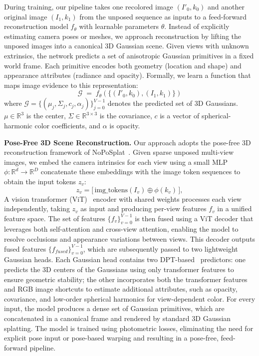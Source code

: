 \documentclass[10pt,twocolumn,letterpaper]{article}
\begin{document}
During training, our pipeline takes one recolored image $(I'_0, k_0)$ and another original image $(I_1, k_1)$ from the unposed sequence as inputs to a feed-forward reconstruction model $f_{\theta}$ with learnable parameters $\theta$.
%
Instead of explicitly estimating camera poses or meshes, we approach reconstruction by lifting the unposed images into a canonical 3D Gaussian scene. Given views with unknown extrinsics, the network predicts a set of anisotropic Gaussian primitives in a fixed world frame. Each primitive encodes both geometry (location and shape) and appearance attributes (radiance and opacity).
%
Formally, we learn a function that maps image evidence to this representation:
\begin{equation*}
\mathcal{G} \;=\; f_{\theta}\!\left(\{(I'_0, k_0),(I_1, k_1)\}\right)
\end{equation*}
where $\mathcal{G}=\{(\mu_j,\Sigma_j,c_j,\alpha_j)\}_{j=0}^{V-1}$ denotes the predicted set of 3D Gaussians. $\mu\!\in\!\mathbb{R}^3$ is the center, $\Sigma\!\in\!\mathbb{R}^{3\times3}$ is the covariance, 
$c$ is a vector of spherical-harmonic color coefficients, and $\alpha$ is opacity.

\vspace{1mm}
\noindent\textbf{Pose-Free 3D Scene Reconstruction.}
Our approach adopts the pose-free 3D reconstruction framework of NoPoSplat~\cite{noposplat}. Given sparse unposed multi-view images, we embed the camera intrinsics for each view using a small MLP $\phi:\mathbb{R}^d \to \mathbb{R}^D$ concatenate these embeddings with the image token sequences to obtain the input tokens $z_v$:
\begin{equation*}
    z_v = \big[\,\text{img\_tokens}(I_v) \oplus \phi(k_v)\,\big],
\end{equation*}
A vision transformer (ViT)~\cite{vit} encoder with shared weights processes each view independently, taking $z_v$ as input and producing per-view features $f_v$ in a unified feature space. The set of features $\{f_v\}_{v=0}^{V-1}$ is then fused using a ViT decoder that leverages both self-attention and cross-view attention, enabling the model to resolve occlusions and appearance variations between views. This decoder outputs fused features $\{f_{fused}\}_{v=0}^{V-1}$, which are subsequently passed to two lightweight Gaussian heads.
%
Each Gaussian head contains two DPT-based~\cite{dust3r} predictors: one predicts the 3D centers of the Gaussians using only transformer features to ensure geometric stability; the other incorporates both the transformer features and RGB image shortcuts to estimate additional attributes, such as opacity, covariance, and low-order spherical harmonics for view-dependent color. For every input, the model produces a dense set of Gaussian primitives, which are concatenated in a canonical frame and rendered by standard 3D Gaussian splatting. The model is trained using photometric losses, eliminating the need for explicit pose input or pose-based warping and resulting in a pose-free, feed-forward pipeline.
\end{document}
